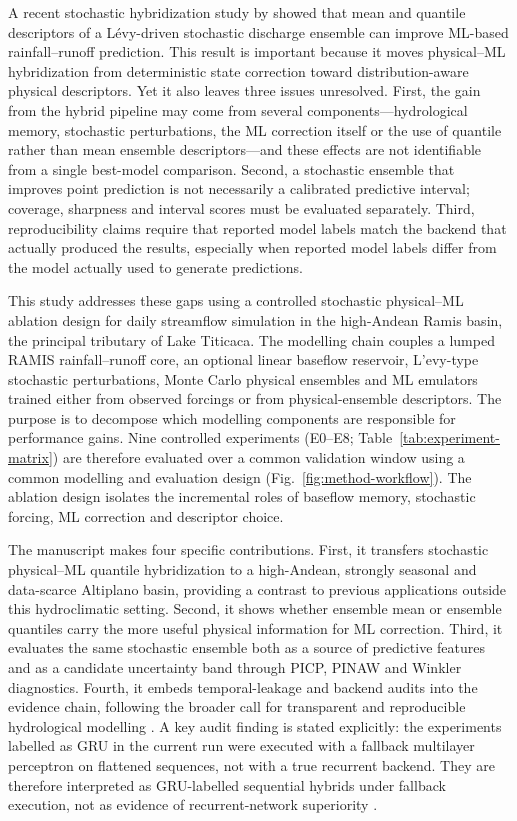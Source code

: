 \documentclass[a4paper,fleqn]{cas-sc}
\begin{document}
A recent stochastic hybridization study by
\citet{houenafa2025hybridization} showed that mean and quantile
descriptors of a L\'{e}vy-driven stochastic discharge ensemble
can improve ML-based rainfall--runoff prediction. This result is
important because it moves physical--ML hybridization from deterministic
state correction toward distribution-aware physical descriptors. Yet it
also leaves three issues unresolved. First, the gain from the hybrid
pipeline may come from several components---hydrological memory,
stochastic perturbations, the ML correction itself or the use of
quantile rather than mean ensemble descriptors---and these effects are
not identifiable from a single best-model comparison. Second, a
stochastic ensemble that improves point prediction is not necessarily a
calibrated predictive interval; coverage, sharpness and interval scores
must be evaluated separately. Third, reproducibility claims require that
reported model labels match the backend that actually produced the
results, especially when reported model labels differ from the model actually
used to generate predictions.

This study addresses these gaps using a controlled stochastic
physical--ML ablation design for daily streamflow simulation in the
high-Andean Ramis basin, the principal tributary of Lake Titicaca. The
modelling chain couples a lumped RAMIS rainfall--runoff core, an
optional linear baseflow reservoir, L'{e}vy-type stochastic
perturbations, Monte Carlo physical ensembles and ML emulators trained
either from observed forcings or from physical-ensemble descriptors. The
purpose is to decompose which modelling components are responsible for
performance gains. Nine controlled experiments (E0--E8;
Table~\ref{tab:experiment-matrix}) are therefore evaluated over a
common validation window using a common modelling and evaluation design
(Fig.~\ref{fig:method-workflow}). The ablation design isolates the
incremental roles of baseflow memory, stochastic forcing, ML correction
and descriptor choice.

The manuscript makes four specific contributions. First, it transfers
stochastic physical--ML quantile hybridization to a high-Andean,
strongly seasonal and data-scarce Altiplano basin, providing a contrast
to previous applications outside this hydroclimatic setting. Second, it
shows whether ensemble mean or ensemble quantiles carry the more useful
physical information for ML correction. Third, it evaluates the same
stochastic ensemble both as a source of predictive features and as a
candidate uncertainty band through PICP, PINAW and Winkler diagnostics.
Fourth, it embeds temporal-leakage and backend audits into the evidence
chain, following the broader call for transparent and reproducible
hydrological modelling \citep{hall2021hydrologist}. A key audit finding
is stated explicitly: the experiments labelled as GRU in the current
run were executed with a fallback multilayer perceptron on flattened
sequences, not with a true recurrent backend. They are therefore
interpreted as GRU-labelled sequential hybrids under fallback execution,
not as evidence of recurrent-network superiority
\citep{kratzert2018rainfall}.
\end{document}
